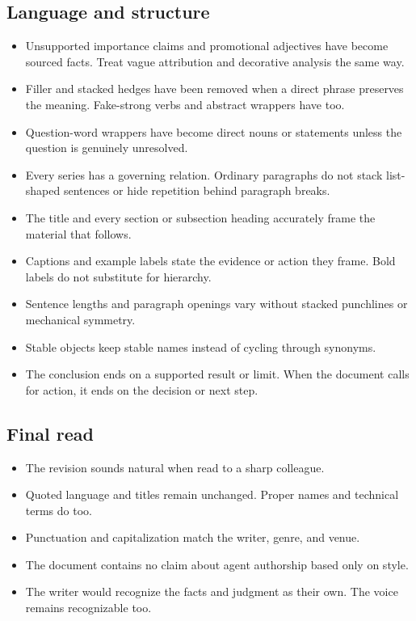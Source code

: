 \subsection{Language and structure}

\begin{itemize}[leftmargin=*,label=\(\square\)]
    \item Unsupported importance claims and promotional adjectives have become
    sourced facts. Treat vague attribution and decorative analysis the same
    way.
    \item Filler and stacked hedges have been removed when a direct phrase
    preserves the meaning. Fake-strong verbs and abstract wrappers have too.
    \item Question-word wrappers have become direct nouns or statements unless
    the question is genuinely unresolved.
    \item Every series has a governing relation. Ordinary paragraphs do not
    stack list-shaped sentences or hide repetition behind paragraph breaks.
    \item The title and every section or subsection heading accurately frame
    the material that follows.
    \item Captions and example labels state the evidence or action they frame.
    Bold labels do not substitute for hierarchy.
    \item Sentence lengths and paragraph openings vary without stacked
    punchlines or mechanical symmetry.
    \item Stable objects keep stable names instead of cycling through
    synonyms.
    \item The conclusion ends on a supported result or limit. When the document
    calls for action, it ends on the decision or next step.
\end{itemize}

\subsection{Final read}

\begin{itemize}[leftmargin=*,label=\(\square\)]
    \item The revision sounds natural when read to a sharp colleague.
    \item Quoted language and titles remain unchanged. Proper names and
    technical terms do too.
    \item Punctuation and capitalization match the writer, genre, and venue.
    \item The document contains no claim about agent authorship based only on
    style.
    \item The writer would recognize the facts and judgment as their own. The
    voice remains recognizable too.
\end{itemize}
